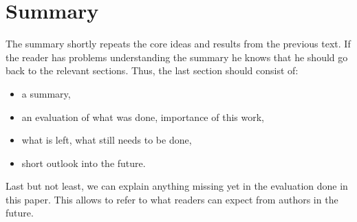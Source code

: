 \documentclass[twocolumn]{article}
\begin{document}
\section{Summary}
\label{summary}

The summary shortly repeats the core ideas and results from the
previous text. If the reader has problems understanding the summary
he knows that he should go back to the relevant sections.
Thus, the last section should consist of:

\begin{itemize}
	\item a summary,
	\item an evaluation of what was done, importance of this work,
	\item what is left, what still needs to be done,
        \item short outlook into the future.
\end{itemize}

Last but not least, we can explain anything missing yet in the evaluation
done in this paper. This allows to refer to what readers can expect from
authors in the future.

\nocite{robotron,
stonx,vice,650sim,herculessim,zib,4004,thermal1,thermal2,rojas,neumann,
neumann1void,neumann2void,neumann3,neumann4,Siewiorek,AmBlBr,Blaauw:1997:CAC,ChPB97,Brom98,Clym93,Buhu99,
Edwa01,Nill99,ABC+90,Rama91,Heid97,Kist95,Klot03,LMcCL92,LFS+92,LMDD92,Vlec03,Cray77,top500,650,Amda67,
Arla88,ODLD86,Hick04,Walk04}



 
\end{document}
